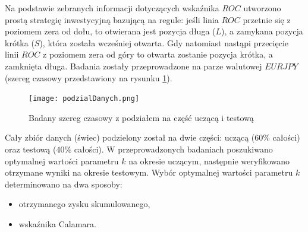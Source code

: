 \documentclass[12pt,a4paper]{article}
\begin{document}
Na podstawie zebranych informacji dotyczących wskaźnika $ROC$ utworzono prostą strategię inwestycyjną bazującą na regule: jeśli linia $ROC$ przetnie się z poziomem zera od dołu, to otwierana jest pozycja długa ($L$), a zamykana pozycja krótka ($S$), która została wcześniej otwarta. Gdy natomiast nastąpi przecięcie linii $ROC$ z poziomem zera od góry to otwarta zostanie pozycja krótka, a zamknięta długa. Badania zostały przeprowadzone na parze walutowej $EURJPY$ (szereg czasowy przedstawiony na rysunku \ref{rysunek2}). \\
\begin{figure}[h!]
\centering
\texttt{[image: podzialDanych.png]}
\caption{Badany szereg czasowy z podziałem na część uczącą i testową}
\label{rysunek2}
\end{figure}
\FloatBarrier
Cały zbiór danych (świec) podzielony został na dwie części: uczącą ($60\%$ całości) oraz testową ($40\%$ całości). W przeprowadzonych badaniach poszukiwano optymalnej wartości parametru $k$ na okresie uczącym, następnie weryfikowano otrzymane wyniki na okresie testowym. Wybór optymalnej wartości parametru $k$ determinowano na dwa sposoby:
\begin{itemize}
\item otrzymanego zysku skumulowanego,
\item wskaźnika Calamara.
\end{itemize}
\end{document}
